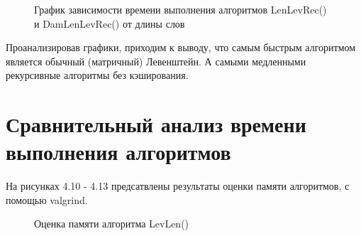 \begin{figure}
	\caption{График зависимости времени выполнения алгоритмов LenLevRec() и DamLenLevRec() от длины слов}
\end{figure}

\newpage
Проанализировав графики, приходим к выводу, что самым быстрым алгоритмом является обычный (матричный) Левенштейн. А самыми медленными рекурсивные алгоритмы без кэширования.

\newpage
\section{Сравнительный анализ времени выполнения алгоритмов}
На рисунках 4.10 - 4.13 предсатвлены результаты оценки памяти алгоритмов, с помощью valgrind.

\begin{figure}
	\caption{Оценка памяти алгоритма LevLen()}
\end{figure}

